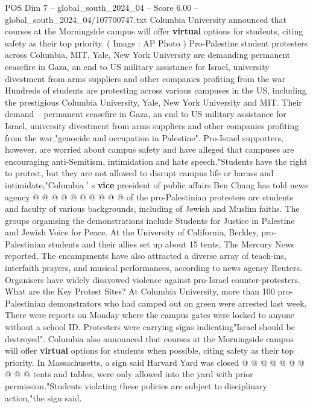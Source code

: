 \begin{textsample}{POS Dim 7 – global\_south\_2024\_04 – Score 6.00 – global\_south\_2024\_04/107700747.txt}  \label{ex:f7_pos_170}
Columbia University announced that courses at the Morningside campus will offer \textbf{virtual} options for students, citing safety as their top priority. ( Image : AP Photo ) Pro-Palestine student protesters across Columbia, MIT, Yale, New York University are demanding permanent ceasefire in Gaza, an end to US military assistance for Israel, university divestment from arms suppliers and other companies profiting from the war Hundreds of students are protesting across various campuses in the US, including the prestigious Columbia University, Yale, New York University and MIT.
Their demand -- permanent ceasefire in Gaza, an end to US military assistance for Israel, university divestment from arms suppliers and other companies profiting from the war,"genocide and occupation in Palestine".
Pro-Israel supporters, however, are worried about campus safety and have alleged that campuses are encouraging anti-Semitism, intimidation and hate speech."Students have the right to protest, but they are not allowed to disrupt campus life or harass and intimidate,"Columbia ' s \textbf{vice} president of public affairs Ben Chang has told news agency @ @ @ @ @ @ @ @ @ @ of the pro-Palestinian protesters are students and faculty of various backgrounds, including of Jewish and Muslim faiths.
The groups organising the demonstrations include Students for Justice in Palestine and Jewish Voice for Peace.
At the University of California, Berkley, pro-Palestinian students and their allies set up about 15 tents, The Mercury News reported.
The encampments have also attracted a diverse array of teach-ins, interfaith prayers, and musical performances, according to news agency Reuters.
Organisers have widely disavowed violence against pro-Israel counter-protesters.
What are the Key Protest Sites?
At Columbia University, more than 100 pro-Palestinian demonstrators who had camped out on green were arrested last week.
There were reports on Monday where the campus gates were locked to anyone without a school ID.
Protesters were carrying signs indicating"Israel should be destroyed".
Columbia also announced that courses at the Morningside campus will offer \textbf{virtual} options for students when possible, citing safety as their top priority.
In Massachusetts, a sign said Harvard Yard was closed @ @ @ @ @ @ @ @ @ @ tents and tables, were only allowed into the yard with prior permission."Students violating these policies are subject to disciplinary action,"the sign said.

\end{textsample}
